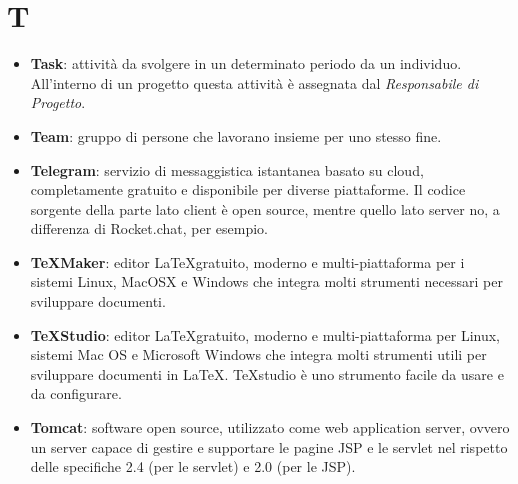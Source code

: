 \newpage
\section{T}

\begin{itemize}
	\item \textbf{Task}: attività da svolgere in un determinato periodo da un individuo. All'interno di un progetto questa attività è assegnata dal \textit{Responsabile di Progetto}.
	\item \textbf{Team}: gruppo di persone che lavorano insieme per uno stesso fine.
	\item \textbf{Telegram}: servizio di messaggistica istantanea basato su cloud, completamente gratuito e disponibile per diverse piattaforme. Il codice sorgente della parte lato client è open source, mentre quello lato server no, a differenza di Rocket.chat, per esempio.
	\item \textbf{TeXMaker}: editor \LaTeX gratuito, moderno e multi-piattaforma per i sistemi Linux, MacOSX e Windows che integra molti strumenti necessari per sviluppare documenti.
	\item \textbf{TeXStudio}: editor \LaTeX gratuito, moderno e multi-piattaforma per Linux, sistemi Mac OS e Microsoft Windows che integra molti strumenti utili per sviluppare documenti in \LaTeX. TeXstudio è uno strumento facile da usare e da configurare.
	\item \textbf{Tomcat}: software open source, utilizzato come web application server, ovvero un server capace di gestire e supportare le pagine JSP e le servlet nel rispetto delle specifiche 2.4 (per le servlet) e 2.0 (per le JSP).
\end{itemize}
